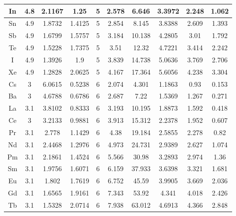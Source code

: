 \documentclass[journal]{IEEEtran}
\begin{document}
{\begin{longtable}{|c|c|c|c|c|c|c|c|c|c|}
			\hline
	\rowcolor{yellow!50}	In       & 4.8 & 2.1167 & 1.25   & 5 & 2.578  & 6.646   & 3.3972  & 2.248  & 1.062   \\
			\hline
	\rowcolor{yellow!50}	Sn       & 4.9 & 1.8732 & 1.4125 & 5 & 2.854  & 8.145   & 3.8388  & 2.609  & 1.393   \\
			\hline
	\rowcolor{yellow!50}	Sb       & 4.9 & 1.6799 & 1.5757 & 5 & 3.184  & 10.138  & 4.2805  & 3.01   & 1.792   \\
			\hline
	\rowcolor{yellow!50}	Te       & 4.9 & 1.5228 & 1.7375 & 5 & 3.51   & 12.32   & 4.7221  & 3.414  & 2.242   \\
			\hline
	\rowcolor{yellow!50}	I        & 4.9 & 1.3926 & 1.9    & 5 & 3.839  & 14.738  & 5.0636  & 3.769  & 2.706   \\
			\hline
	\rowcolor{yellow!50}	Xe       & 4.9 & 1.2828 & 2.0625 & 5 & 4.167  & 17.364  & 5.6056  & 4.238  & 3.304   \\
			\hline
		\rowcolor{green!50}	Cs       & 3   & 6.0615 & 0.5238 & 6 & 2.074  & 4.301   & 1.1863  & 0.93   & 0.153   \\
			\hline
		\rowcolor{green!50}	Ba       & 3   & 4.6788 & 0.6786 & 6 & 2.687  & 7.22    & 1.5369  & 1.267  & 0.271   \\
			\hline
		\rowcolor{green!50}	La       & 3.1 & 3.8102 & 0.8333 & 6 & 3.193  & 10.195  & 1.8873  & 1.592  & 0.418   \\
			\hline
		\rowcolor{green!50}	Ce       & 3   & 3.2133 & 0.9881 & 6 & 3.913  & 15.312  & 2.2378  & 1.952  & 0.607   \\
			\hline
		\rowcolor{green!50}	Pr       & 3.1 & 2.778  & 1.1429 & 6 & 4.38   & 19.184  & 2.5855  & 2.278  & 0.82    \\
			\hline
		\rowcolor{green!50}	Nd       & 3.1 & 2.4468 & 1.2976 & 6 & 4.973  & 24.731  & 2.9389  & 2.627  & 1.074   \\
			\hline
		\rowcolor{yellow!50}	Pm       & 3.1 & 2.1861 & 1.4524 & 6 & 5.566  & 30.98   & 3.2893  & 2.974  & 1.36    \\
			\hline
		\rowcolor{yellow!50}	Sm       & 3.1 & 1.9756 & 1.6071 & 6 & 6.159  & 37.933  & 3.6398  & 3.321  & 1.681   \\
			\hline
		\rowcolor{yellow!50}	Eu       & 3.1 & 1.802  & 1.7619 & 6 & 6.752  & 45.59   & 3.9905  & 3.669  & 2.036   \\
			\hline
		\rowcolor{yellow!50}	Gd       & 3.1 & 1.6565 & 1.9161 & 6 & 7.343  & 53.92   & 4.341   & 4.018  & 2.426   \\
			\hline
		\rowcolor{yellow!50}	Tb       & 3.1 & 1.5328 & 2.0714 & 6 & 7.938  & 63.012  & 4.6913  & 4.366  & 2.848   \\

\end{longtable}}
\end{document}
